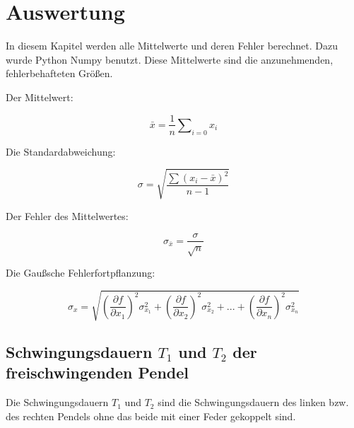 \section{Auswertung}
\label{sec:Auswertung}
In diesem Kapitel werden alle Mittelwerte und deren Fehler berechnet. 
Dazu wurde Python Numpy benutzt. Diese Mittelwerte sind die anzunehmenden, fehlerbehafteten Größen.

Der Mittelwert:
\begin{center}
  \begin{equation}
    \label{eq:Mittelwert}
  \bar{x}=\frac{1}{n}\sum\nolimits_{i=0} x_i
  \end{equation} 
\end{center}

Die Standardabweichung:
\begin{center}
  \begin{equation}
    \label{eq:standardabweichung}
  
    \sigma=\sqrt{\frac{\sum(x_i-\bar{x})^2}{n-1}}
  \end{equation}

  
\end{center}

Der Fehler des Mittelwertes:
\begin{center}
  \begin{equation}
    \label{eq:mittelwertfehler}
    \sigma_{\bar{x}}=\frac{\sigma}{\sqrt{n}}
  \end{equation}

  
\end{center}

Die Gaußsche Fehlerfortpflanzung:
\begin{center}
\begin{equation}
  \label{eq:gaussfehler}  
\sigma_x=\sqrt{(\frac{\partial f}{\partial x_1})^2\sigma_{x_1}^2+(\frac{\partial f}{\partial x_2})^2\sigma_{x_2}^2+...+(\frac{\partial f}{\partial x_n})^2\sigma_{x_n}^2}
\end{equation}
\end{center}



\subsection{Schwingungsdauern $T_1$ und $T_2$ der  freischwingenden Pendel}
Die Schwingungsdauern $T_1$ und $T_2$ sind die Schwingungsdauern des linken bzw. des rechten Pendels ohne das
beide mit einer Feder gekoppelt sind.

